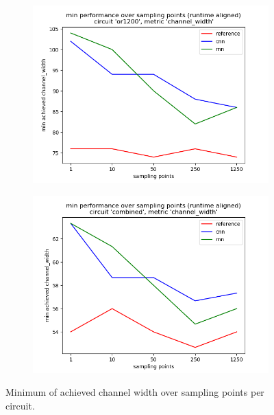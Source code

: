 \begin{figure}[H]
\begin{subfigure}[b]{0.49\linewidth}
		\includegraphics[width=\linewidth]{plots/eval-or1200-chan-width-min-full.png}
	\end{subfigure}
	\begin{subfigure}[b]{0.49\linewidth}
		\includegraphics[width=\linewidth]{plots/eval-combined-chan-width-min-full.png}
	\end{subfigure}
	\caption{Minimum of achieved channel width over sampling points per circuit.}
	\label{fig:eval-chan-width-min}
\end{figure}

